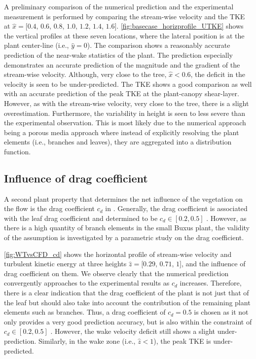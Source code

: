 A preliminary comparison of the numerical prediction and the experimental measurement is performed by comparing the stream-wise velocity and the TKE at $\hat{x} = [0.4$, $0.6$, $0.8$, $1.0$, $1.2$, $1.4$, $1.6]$. \cref{fig:basecase_horizprofile_UTKE} shows the vertical profiles at these seven locations, where the lateral position is at the plant center-line (i.e., $\hat{y} = 0$).  The comparison shows a reasonably accurate prediction of the near-wake statistics of the plant. The prediction especially demonstrates an accurate prediction of the magnitude and the gradient of the stream-wise velocity. Although, very close to the tree, $\hat{x} < 0.6$, the deficit in the velocity is seen to be under-predicted. The TKE shows a good comparison as well with an accurate prediction of the peak TKE at the plant-canopy shear-layer. However, as with the stream-wise velocity, very close to the tree, there is a slight overestimation. Furthermore, the variability in height is seen to less severe than the experimental observation. This is most likely due to the numerical approach being a porous media approach where instead of explicitly resolving the plant elements (i.e., branches and leaves), they are aggregated into a distribution function.

\subsection{Influence of drag coefficient}
\label{subsec:dragcoeff}
A second plant property that determines the net influence of the vegetation on the flow is the drag coefficient $c_d$ in . Generally, the drag coefficient is associated with the leaf drag coefficient and determined to be  $c_d \in [0.2, 0.5]$ \citep{Vogel1989,Wilson1977}. However, as there is a high quantity of branch elements in the small Buxus plant, the validity of the assumption is investigated by a parametric study on the drag coefficient.

\cref{fig:WTvsCFD_cd} shows the horizontal profile of  stream-wise velocity and turbulent kinetic energy at three heights $\hat{z} = [0.29$, $0.71$, $1]$, and the influence of drag coefficient on them. We observe clearly that the numerical prediction convergently approaches to the experimental results as $c_d$ increases. Therefore, there is a clear indication that the drag coefficient of the plant is not just that of the leaf but should also take into account the contribution of the remaining plant elements such as branches. Thus, a drag coefficient of $c_d = 0.5$ is chosen as it not only provides a very good prediction accuracy, but is also within the constraint of  $c_d \in [0.2, 0.5]$ \citep{Vogel1989,Wilson1977}. However, the wake velocity deficit still shows a slight under-prediction. Similarly, in the wake zone (i.e., $\hat{z} < 1$), the peak TKE is under-predicted. 

